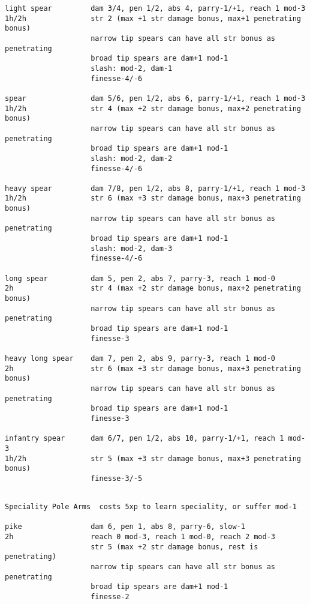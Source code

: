 \begin{verbatim}
light spear         dam 3/4, pen 1/2, abs 4, parry-1/+1, reach 1 mod-3
1h/2h               str 2 (max +1 str damage bonus, max+1 penetrating bonus)
                    narrow tip spears can have all str bonus as penetrating
                    broad tip spears are dam+1 mod-1
                    slash: mod-2, dam-1
                    finesse-4/-6

spear               dam 5/6, pen 1/2, abs 6, parry-1/+1, reach 1 mod-3
1h/2h               str 4 (max +2 str damage bonus, max+2 penetrating bonus)
                    narrow tip spears can have all str bonus as penetrating
                    broad tip spears are dam+1 mod-1
                    slash: mod-2, dam-2
                    finesse-4/-6

heavy spear         dam 7/8, pen 1/2, abs 8, parry-1/+1, reach 1 mod-3
1h/2h               str 6 (max +3 str damage bonus, max+3 penetrating bonus)
                    narrow tip spears can have all str bonus as penetrating
                    broad tip spears are dam+1 mod-1
                    slash: mod-2, dam-3
                    finesse-4/-6

long spear          dam 5, pen 2, abs 7, parry-3, reach 1 mod-0
2h                  str 4 (max +2 str damage bonus, max+2 penetrating bonus)
                    narrow tip spears can have all str bonus as penetrating
                    broad tip spears are dam+1 mod-1
                    finesse-3

heavy long spear    dam 7, pen 2, abs 9, parry-3, reach 1 mod-0
2h                  str 6 (max +3 str damage bonus, max+3 penetrating bonus)
                    narrow tip spears can have all str bonus as penetrating
                    broad tip spears are dam+1 mod-1
                    finesse-3

infantry spear      dam 6/7, pen 1/2, abs 10, parry-1/+1, reach 1 mod-3
1h/2h               str 5 (max +3 str damage bonus, max+3 penetrating bonus)
                    finesse-3/-5


\end{verbatim} \pagebreak[1] \begin{verbatim}
Speciality Pole Arms  costs 5xp to learn speciality, or suffer mod-1

pike                dam 6, pen 1, abs 8, parry-6, slow-1
2h                  reach 0 mod-3, reach 1 mod-0, reach 2 mod-3
                    str 5 (max +2 str damage bonus, rest is penetrating)
                    narrow tip spears can have all str bonus as penetrating
                    broad tip spears are dam+1 mod-1
                    finesse-2


\end{verbatim}
